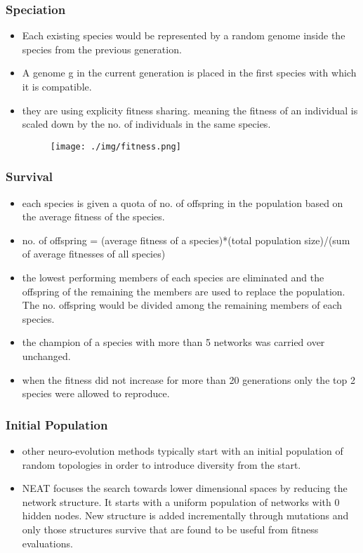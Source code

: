 \documentclass{beamer}
\begin{document}
\begin{frame}
\frametitle{Speciation}
\begin{itemize}
\item Each existing species would be represented by a random genome inside the species from the previous generation.
\item A genome g in the current generation is placed in the first species with which it is compatible.
\item they are using explicity fitness sharing. meaning the fitness of an individual is scaled down by the no. of individuals in the same species.
\begin{figure}
\texttt{[image: ./img/fitness.png]}
\end{figure}
\end{itemize}
\end{frame}

\begin{frame}
\frametitle{Survival}
\begin{itemize}
\item each species is given a quota of no. of offspring in the population based on the average fitness of the species.
\item no. of offspring = (average fitness of a species)*(total population size)/(sum of average fitnesses of all species)
\item the lowest performing members of each species are eliminated and the offspring of the remaining the members are used to replace the population. The no. offspring would be divided among the remaining members of each species.
\item the champion of a species with more than 5 networks was carried over unchanged.
\item when the fitness did not increase for more than 20 generations only the top 2 species were allowed to reproduce.
\end{itemize}
\end{frame}

\begin{frame}
\frametitle{Initial Population}
\begin{itemize}
\item other neuro-evolution methods typically start with an initial population of random topologies in order to introduce diversity from the start.
\item NEAT focuses the search towards lower dimensional spaces by reducing the network structure. It starts with a uniform population of networks with 0 hidden nodes. New structure is added incrementally through mutations and only those structures survive that are found to be useful from fitness evaluations.
\end{itemize}
\end{frame}
\end{document}
